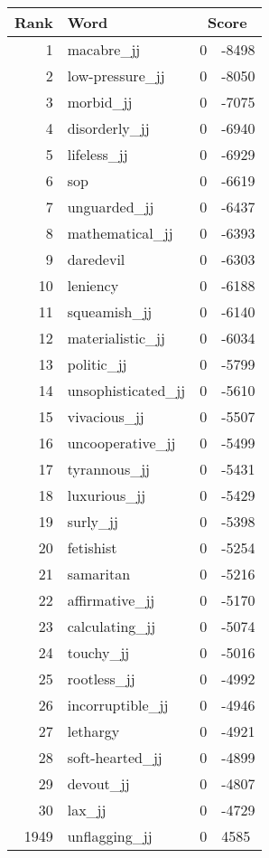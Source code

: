 \begin{longtable}[!htbp]{| rlr@{.}l |}
    \hline
    \textbf{Rank} & \textbf{Word} & \multicolumn{2}{c|}{\textbf{Score}} \\
    \hline
    \endhead
    1 & macabre\_jj & 0 & -8498 \\
    2 & low-pressure\_jj & 0 & -8050 \\
    3 & morbid\_jj & 0 & -7075 \\
    4 & disorderly\_jj & 0 & -6940 \\
    5 & lifeless\_jj & 0 & -6929 \\
    6 & sop & 0 & -6619 \\
    7 & unguarded\_jj & 0 & -6437 \\
    8 & mathematical\_jj & 0 & -6393 \\
    9 & daredevil & 0 & -6303 \\
    10 & leniency & 0 & -6188 \\
    11 & squeamish\_jj & 0 & -6140 \\
    12 & materialistic\_jj & 0 & -6034 \\
    13 & politic\_jj & 0 & -5799 \\
    14 & unsophisticated\_jj & 0 & -5610 \\
    15 & vivacious\_jj & 0 & -5507 \\
    16 & uncooperative\_jj & 0 & -5499 \\
    17 & tyrannous\_jj & 0 & -5431 \\
    18 & luxurious\_jj & 0 & -5429 \\
    19 & surly\_jj & 0 & -5398 \\
    20 & fetishist & 0 & -5254 \\
    21 & samaritan & 0 & -5216 \\
    22 & affirmative\_jj & 0 & -5170 \\
    23 & calculating\_jj & 0 & -5074 \\
    24 & touchy\_jj & 0 & -5016 \\
    25 & rootless\_jj & 0 & -4992 \\
    26 & incorruptible\_jj & 0 & -4946 \\
    27 & lethargy & 0 & -4921 \\
    28 & soft-hearted\_jj & 0 & -4899 \\
    29 & devout\_jj & 0 & -4807 \\
    30 & lax\_jj & 0 & -4729 \\
    1949 & unflagging\_jj & 0 & 4585 \\

\end{longtable}
